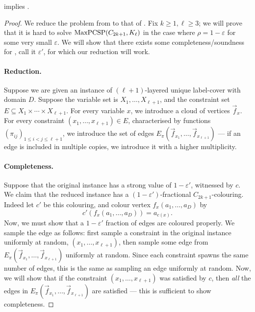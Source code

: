 \documentclass[a4paper,11pt, DIV=11]{scrartcl}
\renewcommand{\epsilon}{\varepsilon}
\DeclareMathOperator{\maxPCSP}{\textup{MaxPCSP}}
\theoremstyle{plain}
\theoremstyle{definition}
\begin{document}
\begin{theorem}
     implies .
\end{theorem}
\begin{proof}
We reduce the problem from  to that of . Fix $k \geq 1, \ell \geq 3$; we will prove that it is hard to solve $\maxPCSP(C_{2k + 1}, K_{\ell})$ in the case where $\rho = 1 - \epsilon$ for some very small $\epsilon$.
We will show that there exists some completeness/soundness for , call it $\epsilon'$, for which our reduction will work.
    
\paragraph{Reduction.} Suppose we are given an instance of $(\ell + 1)$-layered unique label-cover with domain $D$. Suppose the variable set is $X_1, \ldots, X_{\ell + 1}$, and the constraint set $E \subseteq X_1 \times \cdots \times X_{\ell + 1}$. For every variable $x$, we introduce a cloud of vertices $\vec{f}_x$. For every constraint $(x_1, \ldots, x_{\ell + 1}) \in E$, characterised by functions $(\pi_{ij})_{1 \leq i < j \leq \ell + 1}$, we introduce the set of edges $E_\pi(\vec{f}_{x_1}, \ldots, \vec{f}_{x_{\ell + 1}})$ --- if an edge is included in multiple copies, we introduce it with a higher multiplicity.

\paragraph{Completeness.} Suppose that the original instance has a strong value of $1 - \epsilon'$, witnessed by $c$. We claim that the reduced instance has a $(1-\epsilon')$-fractional $C_{2k + 1}$-colouring. Indeed let $c'$ be this colouring, and colour vertex $f_x(a_1, \ldots, a_D)$ by
\[
c'(f_x(a_1, \ldots, a_D)) = a_{c(x)}.
\]
Now, we must show that a $1 - \epsilon'$ fraction of edges are coloured properly. We sample the edge as follows: first sample a constraint in the original instance uniformly at random, $(x_1, \ldots, x_{\ell + 1})$, then sample some edge from $E_\pi(\vec{f}_{x_1}, \ldots, \vec{f}_{x_{\ell + 1}})$ uniformly at random. Since each constraint spawns the same number of edges, this is the same as sampling an edge uniformly at random. Now, we will show that if the constraint $(x_1, \ldots, x_{\ell + 1})$ was satisfied by $c$, then \emph{all} the edges in $E_\pi(\vec{f}_{x_1}, \ldots, \vec{f}_{x_{\ell + 1}})$ are satisfied --- this is sufficient to show completeness.


\end{proof}
\end{document}
